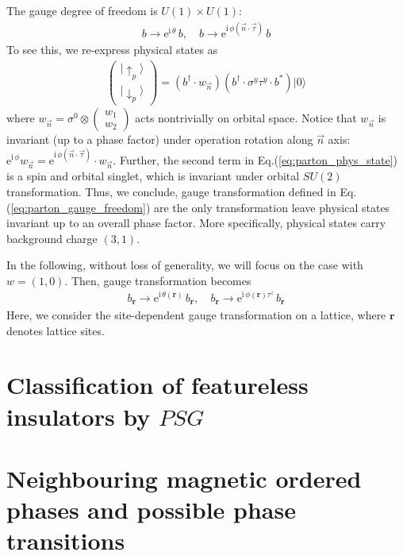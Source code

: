 \documentclass[%
 reprint,
 amsmath,amssymb,
 aps,
 pra, %
]{revtex4-1}
\newcommand{\ee}{\mathrm{e}}
\newcommand{\ii}{\mathrm{i}\,}
\newcommand{\dg}{\dagger}
\begin{document}
The gauge degree of freedom is $U(1)\times U(1)$:
\begin{align}
  b\rightarrow \ee^{\ii\theta}\,b,\quad b\rightarrow\ee^{\ii\phi(\vec{n}\cdot\vec{\tau})}\,b
  \label{eq:parton_gauge_freedom}
\end{align}
To see this, we re-express physical states as
\begin{align}
  \begin{pmatrix} |\uparrow_p\rangle\\[0.2cm]|\downarrow_p\rangle\end{pmatrix}=
  (b^\dg\cdot w_{\vec{n}})(b^\dg\cdot \sigma^y\tau^y \cdot b^*) |0\rangle
  \label{eq:parton_phys_state}
\end{align}
where $w_{\vec{n}}=\sigma^0\otimes\begin{pmatrix}w_1\\w_2\end{pmatrix}$ acts nontrivially on orbital space. Notice that $w_{\vec{n}}$ is invariant (up to a phase factor) under operation rotation along $\vec{n}$ axis: $\ee^{\ii\phi}w_{\vec{n}}=\ee^{\ii\phi(\vec{n}\cdot\vec{\tau})}\cdot w_{\vec{n}}$. Further, the second term in Eq.(\ref{eq:parton_phys_state}) is a spin and orbital singlet, which is invariant under orbital $SU(2)$ transformation. Thus, we conclude, gauge transformation defined in Eq.(\ref{eq:parton_gauge_freedom}) are the only transformation leave physical states invariant up to an overall phase factor. More specifically, physical states carry background charge $(3,1)$.

In the following, without loss of generality, we will focus on the case with $w=(1,0)$. Then, gauge transformation becomes
\begin{align}
  b_{\boldsymbol{r}}\rightarrow \ee^{\ii\theta(\boldsymbol{r})}\,b_{\boldsymbol{r}},\quad b_{\boldsymbol{r}}\rightarrow\ee^{\ii\phi(\boldsymbol{r})\tau^z}\,b_{\boldsymbol{r}}
  \label{}
\end{align}
Here, we consider the site-dependent gauge transformation on a lattice, where $\boldsymbol{r}$ denotes lattice sites.


\section{Classification of featureless insulators by $PSG$}

\section{Neighbouring magnetic ordered phases and possible phase transitions}
\end{document}
